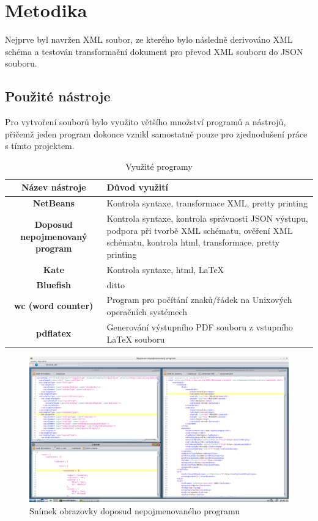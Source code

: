 \documentclass[czech]{article}
\providecommand{\tabularnewline}{\\}
\begin{document}
\section{Metodika}

Nejprve byl navržen XML soubor, ze kterého bylo následně derivováno
XML schéma a testován transformační dokument pro převod XML souboru
do JSON souboru.


\subsection{Použité nástroje}

Pro vytvoření souborů bylo využito většího množství programů a nástrojů,
přičemž jeden program dokonce vznikl samostatně pouze pro zjednodušení
práce s tímto projektem.

\begin{table}[H]
\begin{centering}
\begin{tabular}{|c|>{\centering}p{10cm}|}
\hline 
\textbf{Název nástroje} & \textbf{Důvod využití}\tabularnewline
\hline 
\hline 
\textbf{NetBeans} & Kontrola syntaxe, transformace XML, pretty printing\tabularnewline
\hline 
\textbf{Doposud nepojmenovaný program} & Kontrola syntaxe, kontrola správnosti JSON výstupu, podpora při tvorbě
XML schématu, ověření XML schématu, kontrola html, transformace, pretty
printing\tabularnewline
\hline 
\textbf{Kate} & Kontrola syntaxe, html, \LaTeX{}\tabularnewline
\hline 
\textbf{Bluefish} & ditto\tabularnewline
\hline 
\textbf{wc (word counter)} & Program pro počítání znaků/řádek na Unixových operačních systémech\tabularnewline
\hline 
\textbf{pdflatex} & Generování výstupního PDF souboru z vstupního \LaTeX{} souboru\tabularnewline
\hline 
\end{tabular}
\par\end{centering}

\caption{Využité programy}
\end{table}


\begin{figure}[H]
\begin{centering}
\includegraphics[scale=0.35]{nepojmenovany}
\par\end{centering}

\caption{Snímek obrazovky doposud nepojmenovaného programu}
\end{figure}
\end{document}

